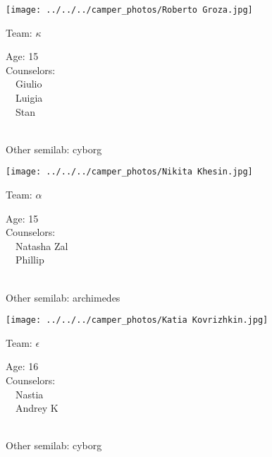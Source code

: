\documentclass[10pt,letterpaper, landscape]{article}
\begin{document}
\horizontalshiftfornextsticker
\renewcommand{\baselinestretch}{1} \begin{sticker}
\noindent\begin{minipage}{0.5\textwidth}\texttt{[image: ../../../camper\_photos/Roberto Groza.jpg]}\end{minipage}\begin{minipage}{0.45\textwidth}
Team: {\Large $\kappa$}

Age:        15\\
Counselors: \\\ \ Giulio\\\ \ Luigia\\\ \ Stan\\
\end{minipage} \\ \vspace{0.07in}
Other semilab: cyborg
\end{sticker}
\verticalshiftfornextsticker
\renewcommand{\baselinestretch}{1} \begin{sticker}
\noindent\begin{minipage}{0.5\textwidth}\texttt{[image: ../../../camper\_photos/Nikita Khesin.jpg]}\end{minipage}\begin{minipage}{0.45\textwidth}
Team: {\Large $\alpha$}

Age:        15\\
Counselors: \\\ \ Natasha Zal\\\ \ Phillip\\
\end{minipage} \\ \vspace{0.07in}
Other semilab: archimedes
\end{sticker}
\horizontalshiftfornextsticker
\renewcommand{\baselinestretch}{1} \begin{sticker}
\noindent\begin{minipage}{0.5\textwidth}\texttt{[image: ../../../camper\_photos/Katia Kovrizhkin.jpg]}\end{minipage}\begin{minipage}{0.45\textwidth}
Team: {\Large $\epsilon$}

Age:        16\\
Counselors: \\\ \ Nastia\\\ \ Andrey K\\
\end{minipage} \\ \vspace{0.07in}
Other semilab: cyborg
\end{sticker}
\end{document}
